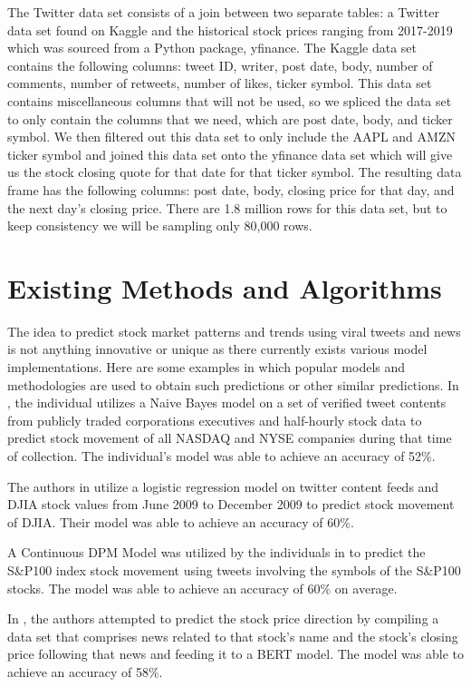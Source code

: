 \documentclass[conference]{IEEEtran}
\begin{document}
The Twitter data set consists of a join between two separate tables: a Twitter data set found on Kaggle and the historical stock prices ranging from 2017-2019 which was sourced from a Python package, yfinance. The Kaggle data set contains the following columns: tweet ID, writer, post date, body, number of comments, number of retweets, number of likes, ticker symbol. This data set contains miscellaneous columns that will not be used, so we spliced the data set to only contain the columns that we need, which are post date, body, and ticker symbol. We then filtered out this data set to only include the AAPL and AMZN ticker symbol and joined this data set onto the yfinance data set which will give us the stock closing quote for that date for that ticker symbol. The resulting data frame has the following columns: post date, body, closing price for that day, and the next day's closing price. There are 1.8 million rows for this data set, but to keep consistency we will be sampling only 80,000 rows. 

\section{Existing Methods and Algorithms}
The idea to predict stock market patterns and trends using viral tweets and news is not anything innovative or unique as there currently exists various model implementations. Here are some examples in which popular models and methodologies are used to obtain such predictions or other similar predictions.
In \cite{b10}, the individual utilizes a Naive Bayes model on a set of verified tweet contents from publicly traded corporations executives and half-hourly stock data to predict stock movement of all NASDAQ and NYSE companies during that time of collection. The individual’s model was able to achieve an accuracy of 52\%.

The authors in \cite{b1} utilize a logistic regression model on twitter content feeds and DJIA stock values from June 2009 to December 2009 to predict stock movement of DJIA. Their model was able to achieve an accuracy of 60\%.

A Continuous DPM Model was utilized by the individuals in \cite{b9} to predict the S\&P100 index stock movement using tweets involving the symbols of the S\&P100 stocks. The model was able to achieve an accuracy of 60\% on average.

In \cite{b15}, the authors attempted to predict the stock price direction by compiling a data set that comprises news related to that stock’s name and the stock’s closing price following that news and feeding it to a BERT model. The model was able to achieve an accuracy of 58\%.
\end{document}
